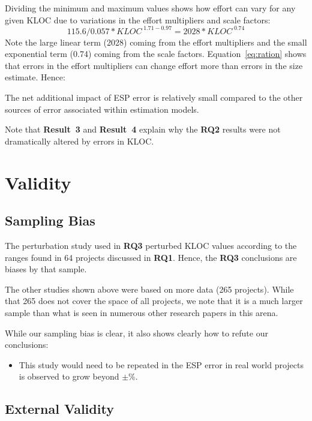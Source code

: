 \documentclass[final,twocolumn]{elsarticle}
\newcommand{\bi}{\begin{itemize}[leftmargin=0.4cm]}
\newcommand{\ei}{\end{itemize}}
\newcommand{\eq}[1]{Equation~\ref{eq:#1}}
\theoremstyle{break}
\begin{document}
Dividing the minimum and maximum values shows 
how    effort can vary for any given KLOC due to variations in the effort multipliers
and scale factors: 
\begin{equation}\label{eq:ration}
115.6/0.057 *\mathit{KLOC}^{\;1.71 - 0.97} = 2028*\mathit{KLOC}^{\;0.74}
\end{equation}
Note the large linear term (2028) coming from the effort multipliers and the
small exponential term (0.74) coming from the scale factors.
\eq{ration} shows that errors in the effort multipliers can change effort more than
errors in the size estimate.
Hence:

\begin{lesson}
  The net additional impact of ESP error is relatively small compared to the other sources of error associated within estimation models.
\end{lesson}

Note that {\bf Result~3} and {\bf Result~4}
explain why the {\bf RQ2} results were not dramatically altered
by errors in KLOC.
 
  

\section{Validity}


\subsection{Sampling Bias}

The perturbation study used in {\bf RQ3} perturbed KLOC values according to the
ranges found in 64 projects discussed in {\bf RQ1}. Hence, the {\bf RQ3} conclusions 
are biases by that sample.

The other studies shown above were based on more data (265 projects).  While
that 265 does not cover the space of all projects, we note that it is a much
larger sample than what is seen in numerous other research papers in this arena.

While our sampling bias is clear, it also shows clearly how to refute our conclusions:
\bi
\item This study would need to be repeated in the ESP error in real world projects
  is observed to grow beyond $\pm$\%.
  \ei


\subsection{External Validity}
\end{document}
